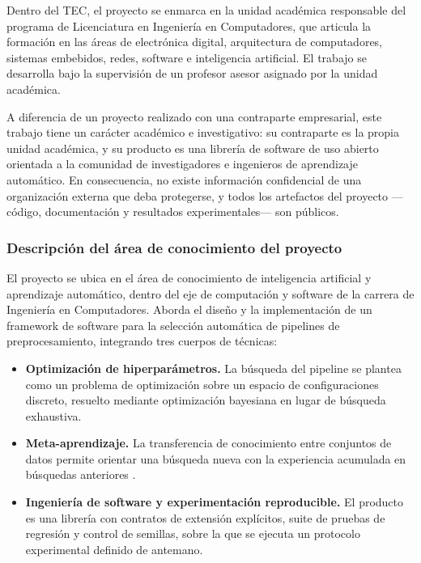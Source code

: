 \documentclass[12pt,letterpaper,oneside]{article}
\begin{document}
Dentro del TEC, el proyecto se enmarca en la unidad académica responsable del programa
de Licenciatura en Ingeniería en Computadores, que articula la formación en las áreas de
electrónica digital, arquitectura de computadores, sistemas embebidos, redes, software e
inteligencia artificial. El trabajo se desarrolla bajo la supervisión de un profesor
asesor asignado por la unidad académica.

A diferencia de un proyecto realizado con una contraparte empresarial, este trabajo
tiene un carácter académico e investigativo: su contraparte es la propia unidad
académica, y su producto es una librería de software de uso abierto orientada a la
comunidad de investigadores e ingenieros de aprendizaje automático. En consecuencia, no
existe información confidencial de una organización externa que deba protegerse, y todos
los artefactos del proyecto —código, documentación y resultados experimentales— son
públicos.

\subsubsection{Descripción del área de conocimiento del proyecto}

El proyecto se ubica en el área de conocimiento de inteligencia artificial y aprendizaje
automático, dentro del eje de computación y software de la carrera de Ingeniería en
Computadores. Aborda el diseño y la implementación de un framework de software para la
selección automática de pipelines de preprocesamiento, integrando tres cuerpos de
técnicas:

\begin{itemize}
  \item \textbf{Optimización de hiperparámetros.} La búsqueda del pipeline se plantea
        como un problema de optimización sobre un espacio de configuraciones discreto,
        resuelto mediante optimización bayesiana \cite{snoek2012practical} en lugar de
        búsqueda exhaustiva.
  \item \textbf{Meta-aprendizaje.} La transferencia de conocimiento entre conjuntos de
        datos permite orientar una búsqueda nueva con la experiencia acumulada en
        búsquedas anteriores \cite{vanschoren2018metalearning, brazdil2009metalearning}.
  \item \textbf{Ingeniería de software y experimentación reproducible.} El producto es
        una librería con contratos de extensión explícitos, suite de pruebas de
        regresión y control de semillas, sobre la que se ejecuta un protocolo
        experimental definido de antemano.
\end{itemize}
\end{document}

